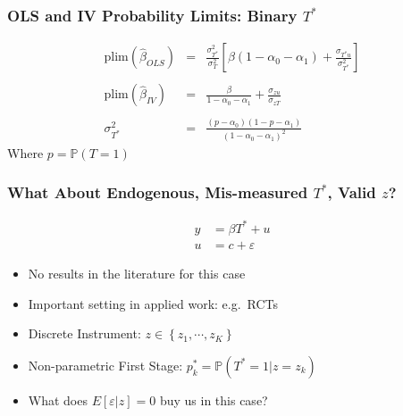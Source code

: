 \documentclass{beamer}
\begin{document}
\begin{frame}
  \frametitle{OLS and IV Probability Limits: Binary $T^*$}
  \small
  \begin{eqnarray*}
    \mbox{plim}\left(\widehat{\beta}_{OLS} \right) &=& \frac{\sigma_{T^*}^2}{\sigma_T^2}\left[\beta \left( 1 - \alpha_0 - \alpha_1 \right) + \frac{\sigma_{T^*u}}{\sigma_{T^*}^2}\right]\\ \\
    \mbox{plim}\left( \widehat{\beta}_{IV} \right) &=& \frac{\beta}{1 - \alpha_0 - \alpha_1} + \frac{\sigma_{zu}}{\sigma_{zT}}\\ \\ 
    \sigma_{T^*}^2 &=& \frac{\left( p - \alpha_0\right)\left( 1 - p - \alpha_1 \right)}{\left(1 -\alpha_0 - \alpha_1\right)^2}
  \end{eqnarray*}
  Where $p = \mathbb{P}(T=1)$
 
\end{frame}
\begin{frame}
  \frametitle{What About Endogenous, Mis-measured $T^*$, Valid $z$?}
\begin{align*}
 y &= \beta T^* + u\\
u &= c + \varepsilon
\end{align*}

  \begin{itemize}
    \item No results in the literature for this case
    \item Important setting in applied work: e.g.\ RCTs
    \item Discrete Instrument: $z \in \left\{ z_1, \cdots, z_K \right\}$
    \item Non-parametric First Stage: $p_k^* = \mathbb{P}(T^*=1|z = z_k)$
    \item What does $E[\varepsilon|z]=0$ buy us in this case?
  \end{itemize}
\end{frame}
\end{document}
